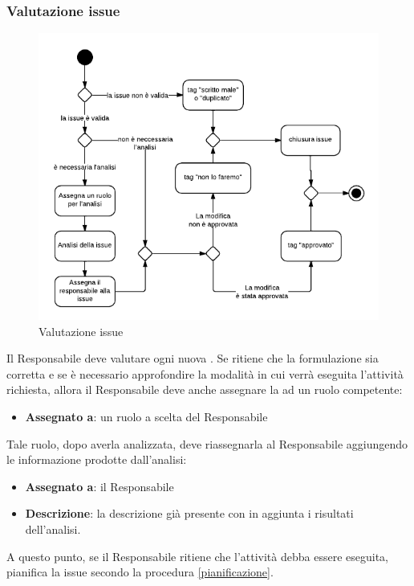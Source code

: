\subsubsection{Valutazione issue}

\begin{figure}[H]
    \centering
    \includegraphics[width=\textwidth]{uml-processi/valutazione_issue.png}
    \caption{Valutazione issue}
\end{figure}

Il Responsabile deve valutare ogni nuova . Se ritiene che la formulazione sia corretta e se è necessario approfondire la modalità in cui verrà eseguita l'attività richiesta, allora il Responsabile deve anche assegnare la  ad un ruolo competente:
\begin{itemize}
 \item \textbf{Assegnato a}: un ruolo a scelta del Responsabile
\end{itemize}

Tale ruolo, dopo averla analizzata, deve riassegnarla al Responsabile aggiungendo le informazione prodotte dall'analisi:
\begin{itemize}
 \item \textbf{Assegnato a}: il Responsabile
 \item \textbf{Descrizione}: la descrizione già presente con in aggiunta i risultati dell'analisi.
\end{itemize}

A questo punto, se il Responsabile ritiene che l'attività debba essere eseguita, pianifica la issue secondo la procedura \ref{pianificazione}.

